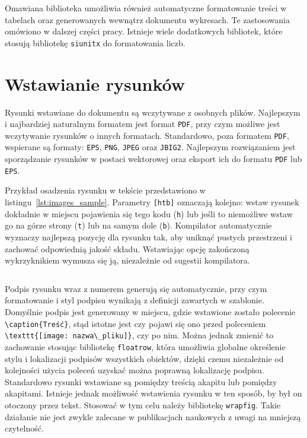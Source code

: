Omawiana biblioteka umożliwia również automatyczne formatowanie treści w tabelach oraz generowanych wewnątrz dokumentu wykresach. Te zastosowania omówiono w dalszej części pracy. Istnieje wiele dodatkowych bibliotek, które stosują bibliotekę \texttt{siunitx} do formatowania liczb.

\section{Wstawianie rysunków}

Rysunki wstawiane do dokumentu są wczytywane z osobnych plików. Najlepszym i najbardziej naturalnym formatem jest format \texttt{PDF}, przy czym możliwe jest wczytywanie rysunków o innych formatach. Standardowo, poza formatem \texttt{PDF}, wspierane są formaty: \texttt{EPS}, \texttt{PNG}, \texttt{JPEG} oraz \texttt{JBIG2}. Najlepszym rozwiązaniem jest sporządzanie rysunków w postaci wektorowej oraz eksport ich do formatu \texttt{PDF} lub \texttt{EPS}.

Przykład osadzenia rysunku w tekście przedstawiono w listingu~\ref{lst:images_sample}. Parametry \verb|[htb]| oznaczają kolejno: wstaw rysunek dokładnie w miejscu pojawienia się tego kodu (\texttt{h}) lub jeśli to niemożliwe wstaw go na górze strony (\texttt{t}) lub na samym dole (\texttt{b}). Kompilator automatycznie wyznaczy najlepszą pozycję dla rysunku tak, aby uniknąć pustych przestrzeni i zachować odpowiednią jakość składu. Wstawiając opcję zakończoną wykrzyknikiem wymusza się ją, niezależnie od sugestii kompilatora.

\begin{listing}[htb]
\inputminted{latex}{skrypty/images_sample.tex}
\end{listing}

Podpis rysunku wraz z numerem generują się automatycznie, przy czym formatowanie i styl podpisu wynikają z definicji zawartych w szablonie. Domyślnie podpis jest generowany w miejscu, gdzie wstawione zostało polecenie \verb|\caption{Treść}|, stąd istotne jest czy pojawi się ono przed poleceniem \verb|\texttt{[image: nazwa\_pliku]}|, czy po nim. Można jednak zmienić to zachowanie stosując bibliotekę \texttt{floatrow}, która umożliwia globalne określenie stylu i lokalizacji podpisów wszystkich obiektów, dzięki czemu niezależnie od kolejności użycia poleceń uzyskać można poprawną lokalizację podpisu. Standardowo rysunki wstawiane są pomiędzy treścią akapitu lub pomiędzy akapitami. Istnieje jednak możliwość wstawienia rysunku w ten sposób, by był on otoczony przez tekst. Stosować w tym celu należy bibliotekę \texttt{wrapfig}. Takie działanie nie jest zwykle zalecane w publikacjach naukowych z uwagi na mniejszą czytelność.

